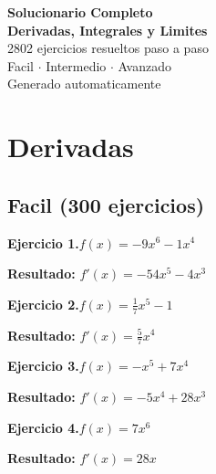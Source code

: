 \documentclass[10pt,a4paper]{article}
\begin{document}
\begin{titlepage}
\centering
\vspace*{3cm}
{\Huge\bfseries Solucionario Completo\\[0.3cm] Derivadas, Integrales y Limites}\\[1cm]
{\Large 2802 ejercicios resueltos paso a paso}\\[0.5cm]
{\large Facil $\cdot$ Intermedio $\cdot$ Avanzado}\\[3cm]
\vfill
{\small Generado automaticamente}
\end{titlepage}

\tableofcontents
\newpage

\section{Derivadas}

\subsection{Facil (300 ejercicios)}

\begin{ejbox}
\textbf{Ejercicio 1.}\quad $f(x) = -9x^{6} -1x^{4}$
\end{ejbox}

\begin{solbox}
\textbf{Resultado:} \(\displaystyle f'(x) = -54x^{5} -4x^{3}\)
\end{solbox}

\begin{ejbox}
\textbf{Ejercicio 2.}\quad $f(x) = \frac{1}{7}x^{5} -1$
\end{ejbox}

\begin{solbox}
\textbf{Resultado:} \(\displaystyle f'(x) = \frac{5}{7}x^{4}\)
\end{solbox}

\begin{ejbox}
\textbf{Ejercicio 3.}\quad $f(x) = -x^{5} + 7x^{4}$
\end{ejbox}

\begin{solbox}
\textbf{Resultado:} \(\displaystyle f'(x) = -5x^{4} + 28x^{3}\)
\end{solbox}

\newpage
\begin{ejbox}
\textbf{Ejercicio 4.}\quad $f(x) = 7x^{6}$
\end{ejbox}

\begin{solbox}
\textbf{Resultado:} \(\displaystyle f'(x) = 28x\)
\end{solbox}
\end{document}
